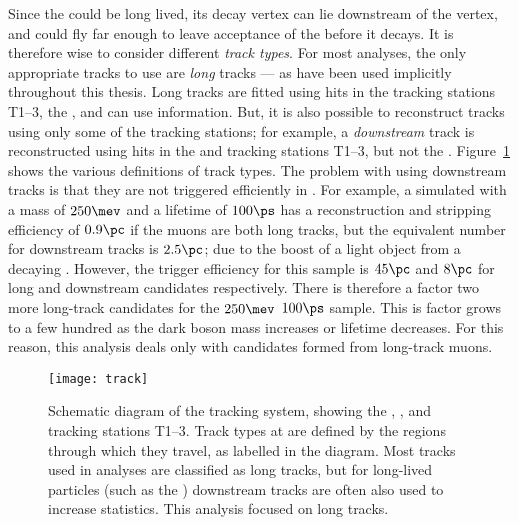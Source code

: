 Since the \db could be long lived, its decay vertex can lie downstream of the \Bd vertex, and could
fly far enough to leave acceptance of the \velo before it decays.
It is therefore wise to consider different \emph{track types}.
For most \lhcb analyses, the only appropriate tracks to use are \emph{long} tracks --- as
have been used implicitly throughout this thesis.
Long tracks are fitted using hits in the tracking stations T1--3, the \velo, and can use \ttracker
information.
But, it is also possible to reconstruct tracks using only some of the tracking stations; for
example, a \emph{downstream} track is reconstructed using hits in the \ttracker and tracking
stations T1--3, but not the \velo.
Figure~\ref{fig:db:lldd} shows the various definitions of track types.
The problem with using downstream tracks is that they are not triggered efficiently in \hlttwo.
For example, a simulated \db with a mass of $250\mev$ and a lifetime of $100\ps$ has a
reconstruction and
stripping efficiency of \approx$0.9\pc$ if the muons are both long tracks, but the equivalent
number for downstream tracks is \approx$2.5\pc$; due to the boost of a light object from a decaying
\Bd.
However, the trigger efficiency for this sample is \approx$45\pc$ and $8\pc$ for long and
downstream candidates respectively.
There is therefore a factor two more long-track candidates for the $250\mev$ $100\ps$ sample.
This is factor grows to a few hundred as the dark boson mass increases or lifetime decreases.
For this reason, this analysis deals only with \db candidates formed from long-track muons.

\begin{figure}
  \begin{center}
    \texttt{[image: track]}
    \caption[Track definitions in the LHCb detector]
    {
      Schematic diagram of the \lhcb tracking system, showing the \velo, \ttracker, and tracking
      stations T1--3.
      Track types at \lhcb are defined by the regions through which they travel, as labelled in the
      diagram.
      Most tracks used in analyses are classified as long tracks, but for long-lived particles
      (such as the \KS) downstream tracks are often also used to increase statistics.
      This analysis focused on long tracks.
    }
    \label{fig:db:lldd}
  \end{center}
\end{figure}



